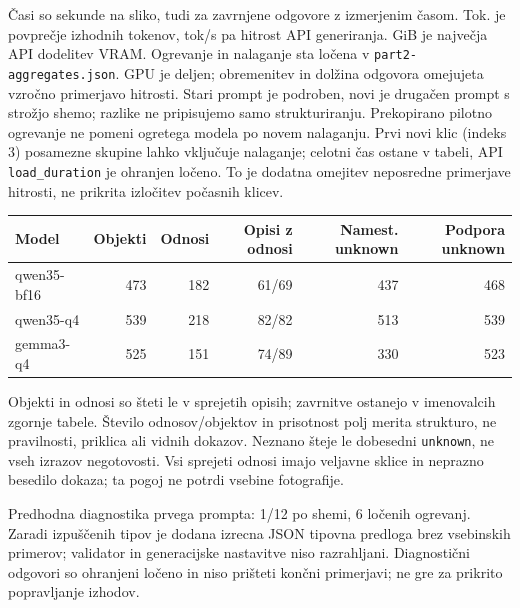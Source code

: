 Časi so sekunde na sliko, tudi za zavrnjene odgovore z izmerjenim časom. Tok. je povprečje izhodnih tokenov, tok/s pa hitrost API generiranja. GiB je največja API dodelitev VRAM. Ogrevanje in nalaganje sta ločena v \texttt{part2-aggregates.json}. GPU je deljen; obremenitev in dolžina odgovora omejujeta vzročno primerjavo hitrosti. Stari prompt je podroben, novi je drugačen prompt s strožjo shemo; razlike ne pripisujemo samo strukturiranju.
Prekopirano pilotno ogrevanje ne pomeni ogretega modela po novem nalaganju. Prvi novi klic (indeks 3) posamezne skupine lahko vključuje nalaganje; celotni čas ostane v tabeli, API \texttt{load\_duration} je ohranjen ločeno. To je dodatna omejitev neposredne primerjave hitrosti, ne prikrita izločitev počasnih klicev.
\begin{center}\small\begin{tabular}{lrrrrr}\toprule
Model & Objekti & Odnosi & Opisi z odnosi & Namest. unknown & Podpora unknown \\ \midrule
qwen35-bf16 & 473 & 182 & 61/69 & 437 & 468 \\
qwen35-q4 & 539 & 218 & 82/82 & 513 & 539 \\
gemma3-q4 & 525 & 151 & 74/89 & 330 & 523 \\
\bottomrule\end{tabular}\end{center}

Objekti in odnosi so šteti le v sprejetih opisih; zavrnitve ostanejo v imenovalcih zgornje tabele. Število odnosov/objektov in prisotnost polj merita strukturo, ne pravilnosti, priklica ali vidnih dokazov. Neznano šteje le dobesedni \texttt{unknown}, ne vseh izrazov negotovosti. Vsi sprejeti odnosi imajo veljavne sklice in neprazno besedilo dokaza; ta pogoj ne potrdi vsebine fotografije.

Predhodna diagnostika prvega prompta: 1/12 po shemi, 6 ločenih ogrevanj. Zaradi izpuščenih tipov je dodana izrecna JSON tipovna predloga brez vsebinskih primerov; validator in generacijske nastavitve niso razrahljani. Diagnostični odgovori so ohranjeni ločeno in niso prišteti končni primerjavi; ne gre za prikrito popravljanje izhodov.

\newpage
